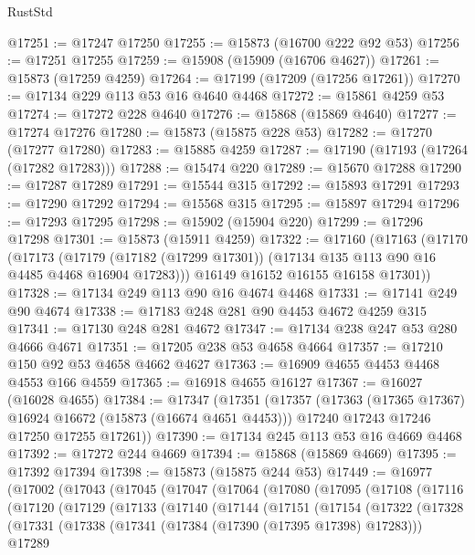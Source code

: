 \begin{lexlean}{RustStd}
\begin{coremodule}
@17251 := @17247 @17250
@17255 := @15873 (@16700 @222 @92 @53)
@17256 := @17251 @17255
@17259 := @15908 (@15909 (@16706 @4627))
@17261 := @15873 (@17259 @4259)
@17264 := @17199 (@17209 (@17256 @17261))
@17270 := @17134 @229 @113 @53 @16 @4640 @4468
@17272 := @15861 @4259 @53
@17274 := @17272 @228 @4640
@17276 := @15868 (@15869 @4640)
@17277 := @17274 @17276
@17280 := @15873 (@15875 @228 @53)
@17282 := @17270 (@17277 @17280)
@17283 := @15885 @4259
@17287 := @17190 (@17193 (@17264 (@17282 @17283)))
@17288 := @15474 @220
@17289 := @15670 @17288
@17290 := @17287 @17289
@17291 := @15544 @315
@17292 := @15893 @17291
@17293 := @17290 @17292
@17294 := @15568 @315
@17295 := @15897 @17294
@17296 := @17293 @17295
@17298 := @15902 (@15904 @220)
@17299 := @17296 @17298
@17301 := @15873 (@15911 @4259)
@17322 := @17160
    (@17163
      (@17170
        (@17173
          (@17179 (@17182 (@17299 @17301)) (@17134 @135 @113 @90 @16 @4485 @4468 @16904 @17283)))
        @16149
        @16152
        @16155
        @16158
        @17301))
@17328 := @17134 @249 @113 @90 @16 @4674 @4468
@17331 := @17141 @249 @90 @4674
@17338 := @17183 @248 @281 @90 @4453 @4672 @4259 @315
@17341 := @17130 @248 @281 @4672
@17347 := @17134 @238 @247 @53 @280 @4666 @4671
@17351 := @17205 @238 @53 @4658 @4664
@17357 := @17210 @150 @92 @53 @4658 @4662 @4627
@17363 := @16909 @4655 @4453 @4468 @4553 @166 @4559
@17365 := @16918 @4655 @16127
@17367 := @16027 (@16028 @4655)
@17384 := @17347
    (@17351
      (@17357
        (@17363 (@17365 @17367) @16924 @16672 (@15873 (@16674 @4651 @4453)))
        @17240
        @17243
        @17246
        @17250
        @17255
        @17261))
@17390 := @17134 @245 @113 @53 @16 @4669 @4468
@17392 := @17272 @244 @4669
@17394 := @15868 (@15869 @4669)
@17395 := @17392 @17394
@17398 := @15873 (@15875 @244 @53)
@17449 := @16977
    (@17002
      (@17043
        (@17045
          (@17047
            (@17064
              (@17080
                (@17095
                  (@17108
                    (@17116
                      (@17120
                        (@17129
                          (@17133
                            (@17140
                              (@17144
                                (@17151
                                  (@17154
                                    (@17322
                                      (@17328
                                        (@17331
                                          (@17338
                                            (@17341 (@17384 (@17390 (@17395 @17398) @17283)))
                                            @17289

\end{coremodule}
\end{lexlean}
